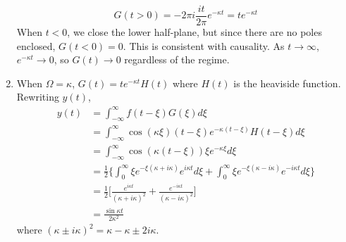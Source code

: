 \documentclass[a4paper]{article}
\begin{document}
\begin{ans}
\begin{enumerate}[label=(\alph*)]
\begin{center}
  \end{center}
$$G(t>0)=-2\pi i\frac{it}{2\pi}e^{-\kappa t}=te^{-\kappa t}$$
When $t<0$, we close the lower half-plane, but since there are no poles enclosed, $G(t<0)=0$. This is consistent with causality. As $t\rightarrow\infty$, $e^{-\kappa t}\rightarrow 0$, so $G(t)\rightarrow 0$ regardless of the regime.
\item When $\Omega=\kappa$, $G(t)=te^{-\kappa t}H(t)$ where $H(t)$ is the heaviside function. Rewriting $y(t)$,
\begin{align}
y(t)&=\int_{-\infty}^\infty f(t-\xi)G(\xi)d\xi\nonumber\\&=\int_{-\infty}^\infty\cos(\kappa\xi)(t-\xi)e^{-\kappa(t-\xi)}H(t-\xi)d\xi\nonumber\\&=\int_{-\infty}^\infty\cos(\kappa(t-\xi))\xi e^{-\kappa\xi}d\xi\nonumber\\&=\frac{1}{2}\bigg\{\int_0^\infty\xi e^{-\xi(\kappa+i\kappa)}e^{i\kappa t}d\xi+\int_0^\infty\xi e^{-\xi(\kappa-i\kappa)}e^{-i\kappa t}d\xi\bigg\}\nonumber\\&=\frac{1}{2}\bigg[\frac{e^{i\kappa t}}{(\kappa+i\kappa)^2}+\frac{e^{-i\kappa t}}{(\kappa-i\kappa)^2}\bigg]\nonumber\\&=\frac{\sin\kappa t}{2\kappa^2}\nonumber
\end{align}
where $(\kappa\pm i\kappa)^2=\kappa-\kappa\pm2i\kappa$.
\end{enumerate}
\end{ans}
\end{document}

